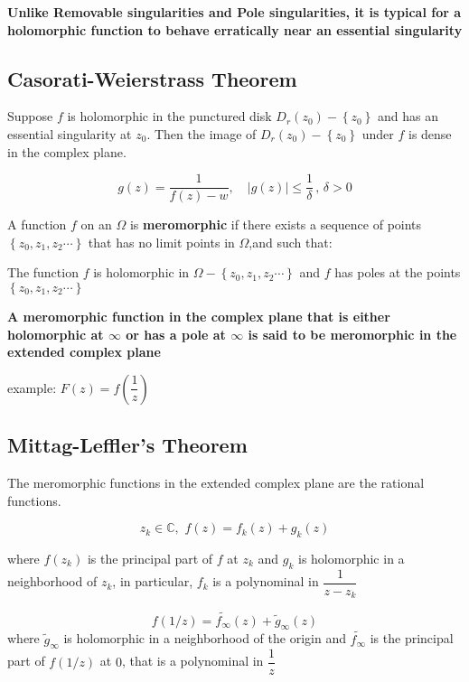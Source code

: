 \documentclass[11pt]{article}
\begin{document}
\textbf{Unlike Removable singularities and Pole singularities, it is
typical for a holomorphic function to behave erratically near an
essential singularity}

    \subsection{Casorati-Weierstrass
Theorem}\label{casorati-weierstrass-theorem}

Suppose \(f\) is holomorphic in the punctured disk
\(D_{r}(z_{0})-\left\{z_{0}\right\}\) and has an essential singularity
at \(z_{0}\). Then the image of \(D_{r}(z_{0})-\left\{z_{0}\right\}\)
under \(f\) is dense in the complex plane.

\[g(z)=\dfrac{1}{f(z)-w},\quad \left|g(z)\right| \le \frac{1}{\delta}\,,\,\delta >0\]

A function \(f\) on an \(\Omega\) is \textbf{meromorphic} if there
exists a sequence of points \(\left\{z_{0},z_{1},z_{2}\cdots\right\}\)
that has no limit points in \(\Omega\),and such that:

The function \(f\) is holomorphic in
\(\Omega - \left\{z_{0},z_{1},z_{2}\cdots\right\}\) and \(f\) has poles
at the points \(\left\{z_{0},z_{1},z_{2}\cdots\right\}\)

\textbf{A meromorphic function in the complex plane that is either
holomorphic at \(\infty\) or has a pole at \(\infty\) is said to be
meromorphic in the extended complex plane}

example: \(F(z)=f(\dfrac{1}{z})\)

    \subsection{Mittag-Leffler's Theorem}\label{mittag-lefflers-theorem}

The meromorphic functions in the extended complex plane are the rational
functions.

\[z_{k}\in\mathbb{C},\,\,f(z)=f_{k}(z)+g_{k}(z)\]

where \(f(z_{k})\) is the principal part of \(f\) at \(z_{k}\) and
\(g_{k}\) is holomorphic in a neighborhood of \(z_{k}\), in particular,
\(f_{k}\) is a polynominal in \(\dfrac{1}{z-z_{k}}\)

\[f(1/z)=\tilde{f_{\infty}}(z) + \tilde{g}_{\infty}(z)\] where
\(\tilde{g}_{\infty}\) is holomorphic in a neighborhood of the origin
and \(\tilde{f_{\infty}}\) is the principal part of \(f(1/z)\) at \(0\),
that is a polynominal in \(\dfrac{1}{z}\)
\end{document}
